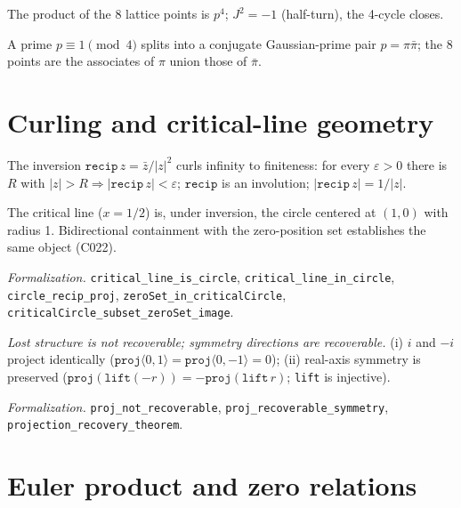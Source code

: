 \documentclass[sigplan,10pt,anonymous,review]{acmart}
\begin{document}
\begin{theorem}\label{thm:product}
The product of the 8 lattice points is $p^4$; $J^2 = -1$ (half-turn), the 4-cycle
closes.
\end{theorem}

\begin{theorem}[splitting, C024]\label{thm:split}
A prime $p \equiv 1 \pmod 4$ splits into a conjugate Gaussian-prime pair
$p = \pi\bar\pi$; the 8 points are the associates of $\pi$ union those of $\bar\pi$.
\end{theorem}

\section{Curling and critical-line geometry}

\begin{theorem}[curling, C015]\label{thm:curl}
The inversion $\texttt{recip}\, z = \bar z/|z|^2$ curls infinity to finiteness: for
every $\varepsilon > 0$ there is $R$ with $|z|>R \Rightarrow |\texttt{recip}\,z|<\varepsilon$;
$\texttt{recip}$ is an involution; $|\texttt{recip}\,z| = 1/|z|$.
\end{theorem}

\begin{theorem}\label{thm:circle}
The critical line ($x=1/2$) is, under inversion, the circle centered at $(1,0)$ with
radius 1. Bidirectional containment with the zero-position set establishes the same
object (C022).
\end{theorem}
\emph{Formalization.} \texttt{critical\_line\_is\_circle},
\texttt{critical\_line\_in\_circle}, \texttt{circle\_recip\_proj},
\texttt{zeroSet\_in\_criticalCircle}, \texttt{criticalCircle\_subset\_zeroSet\_image}.

\begin{theorem}[recoverability, C011]\label{thm:recover}
\emph{Lost structure is not recoverable; symmetry directions are recoverable.}
(i) $i$ and $-i$ project identically ($\texttt{proj}\langle 0,1\rangle =
\texttt{proj}\langle 0,-1\rangle = 0$); (ii) real-axis symmetry is preserved
($\texttt{proj}(\texttt{lift}(-r)) = -\texttt{proj}(\texttt{lift}\,r)$; \texttt{lift}
is injective).
\end{theorem}
\emph{Formalization.} \texttt{proj\_not\_recoverable},
\texttt{proj\_recoverable\_symmetry}, \texttt{projection\_recovery\_theorem}.

\section{Euler product and zero relations}
\end{document}
